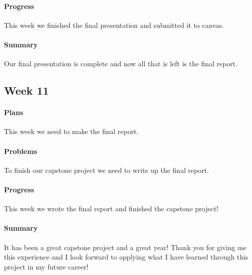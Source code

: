 \documentclass{article}
\begin{document}
\paragraph{Progress}
This week we finished the final presentation and submitted it to canvas.
\paragraph{Summary}
Our final presentation is complete and now all that is left is the final report.
\subsection{Week 11}
\paragraph{Plans}
This week we need to make the final report.
\paragraph{Problems}
To finish our capstone project we need to write up the final report.
\paragraph{Progress}
This week we wrote the final report and finished the capstone project!
\paragraph{Summary}
It has been a great capstone project and a great year! Thank you for giving me this experience and I look forward to applying what I have learned through this project in my future career!
\end{document}
